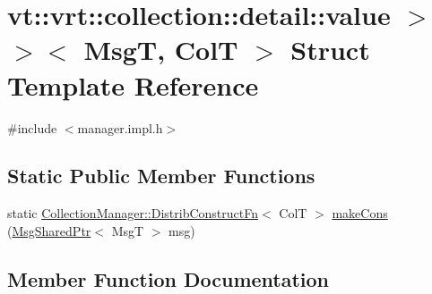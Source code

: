 \hypertarget{structvt_1_1vrt_1_1collection_1_1detail_1_1_insert_msg_dispatcher_3_01_msg_t_00_01_col_t_00_01st63328b77cb25348343d0eb4c4a2955e0}{}\section{vt\+:\+:vrt\+:\+:collection\+:\+:detail\+:\+:value $>$$>$$<$ MsgT, ColT $>$ Struct Template Reference}
\label{structvt_1_1vrt_1_1collection_1_1detail_1_1_insert_msg_dispatcher_3_01_msg_t_00_01_col_t_00_01st63328b77cb25348343d0eb4c4a2955e0}


{\ttfamily \#include $<$manager.\+impl.\+h$>$}

\subsection*{Static Public Member Functions}
\begin{DoxyCompactItemize}
\item 
static \hyperlink{structvt_1_1vrt_1_1collection_1_1_collection_manager_a9ef5ab71e344fdee8525c3f18241c305}{Collection\+Manager\+::\+Distrib\+Construct\+Fn}$<$ ColT $>$ \hyperlink{structvt_1_1vrt_1_1collection_1_1detail_1_1_insert_msg_dispatcher_3_01_msg_t_00_01_col_t_00_01st63328b77cb25348343d0eb4c4a2955e0_a9a3fead2e25e2b6be20c8875fbb0026f}{make\+Cons} (\hyperlink{namespacevt_ab2b3d506ec8e8d1540aede826d84a239}{Msg\+Shared\+Ptr}$<$ MsgT $>$ msg)
\end{DoxyCompactItemize}


\subsection{Member Function Documentation}
\mbox{\label{structvt_1_1vrt_1_1collection_1_1detail_1_1_insert_msg_dispatcher_3_01_msg_t_00_01_col_t_00_01st63328b77cb25348343d0eb4c4a2955e0_a9a3fead2e25e2b6be20c8875fbb0026f}} 
